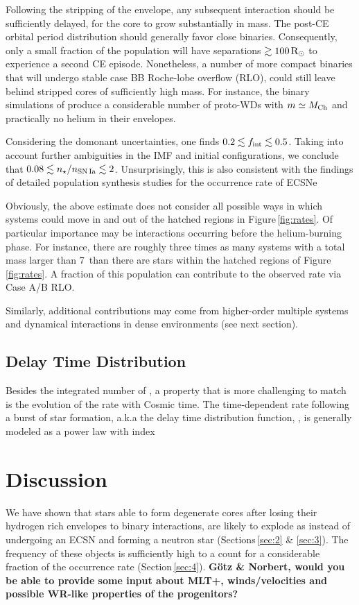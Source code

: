 \documentclass[twocolumn,tighten,times]{aastex62}
\begin{document}
Following the stripping of the envelope, any 
subsequent interaction should be sufficiently delayed, for the core to 
grow substantially in mass. The post-CE orbital period distribution should generally 
favor close binaries. Consequently, only a small fraction of the population will have 
separations $\gtrsim 100\mathrm{\,R_\odot}$ to experience a second CE episode. 
Nonetheless, a number of more compact binaries that will undergo stable case BB Roche-lobe 
overflow (RLO), could still leave behind stripped \one cores of sufficiently high mass. For instance, the
binary simulations of \cite{Tauris:2015xra} produce a considerable number of \one proto-WDs 
with $m\simeq M_{\mathrm{Ch}}$ and practically no helium in their envelopes.  

Considering the domonant uncertainties, one finds $0.2 \lesssim f_{\rm int}\lesssim 0.5$. 
Taking into account further ambiguities in the IMF and initial configurations, we conclude that $0.08\lesssim n_\star / n_{\rm SN\,Ia} \lesssim 2$. Unsurprisingly, this is also consistent with the findings of detailed population synthesis studies for the occurrence rate of ECSNe \citep[e.g.][]{Jones:2018ule}

Obviously, the above estimate does not consider all possible ways in 
which  systems could move in and out of the hatched regions in 
Figure\,\ref{fig:rates}. Of particular importance may be interactions 
occurring before the helium-burning phase. For instance, there are  
roughly three times as many systems with a total mass larger than 7\msun\  
than there are stars within the hatched regions of Figure\,\ref{fig:rates}. 
A fraction of this population can contribute to the observed rate via Case A/B RLO. 

Similarly,  additional contributions may come from higher-order multiple systems and dynamical interactions in dense environments (see next section). 

\subsection{Delay Time Distribution}\label{sec:4.2}
Besides the integrated number of \ias, a property that is more challenging to match is the evolution of the \ia rate with Cosmic time. 
The time-dependent \ia rate following a burst of star formation, a.k.a the delay time distribution function, \dtd, is generally modeled as a power law with index  

\section{Discussion}\label{sec:5}
We have shown that stars able to form degenerate \one cores after losing 
their hydrogen rich envelopes to binary interactions, are likely to explode 
as \ias instead of undergoing an ECSN and forming a neutron star
(Sections\,\ref{sec:2} \& \ref{sec:3}). The frequency of these objects is 
sufficiently high to a count for a considerable fraction of the \ia 
occurrence rate (Section\,\ref{sec:4}). 
{\bf G\"{o}tz \& Norbert, would you be able to provide some input about 
MLT+,  winds/velocities and possible WR-like properties of the progenitors?}
\end{document}
